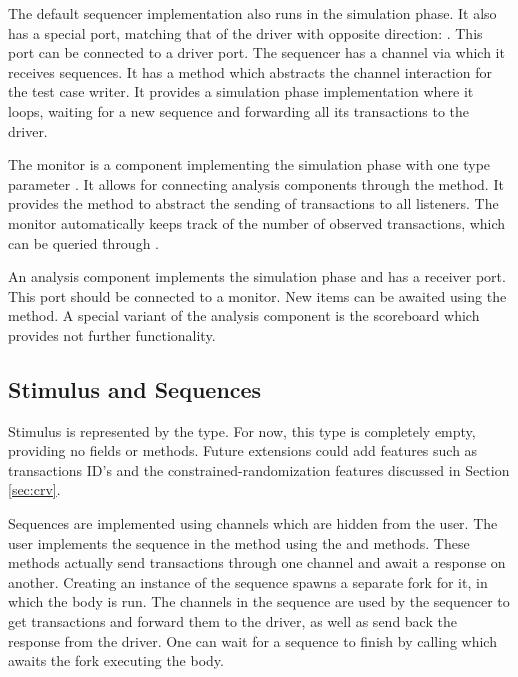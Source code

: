 The default sequencer implementation also runs in the simulation phase. It also has a special port, matching that of
the driver with opposite direction: . This port can be connected to a driver port. The
sequencer has a channel via which it receives sequences. It has a  method which
abstracts the channel interaction for the test case writer. It provides a simulation phase implementation where it
loops, waiting for a new sequence and forwarding all its transactions to the driver.

The monitor is a component implementing the simulation phase with one type parameter . It allows for
connecting analysis components through the  method. It provides the
 method to abstract the sending of transactions to all listeners. The monitor automatically keeps
track of the number of observed transactions, which can be queried through .

An analysis component implements the simulation phase and has a receiver port. This port should be connected to a
monitor. New items can be awaited using the  method. A special variant of the analysis component is the
scoreboard which provides not further functionality.

\subsection{Stimulus and Sequences} %

Stimulus is represented by the  type. For now, this type is completely empty, providing no fields or
methods. Future extensions could add features such as transactions ID's and the constrained-randomization features
discussed in Section \ref{sec:crv}.

Sequences are implemented using channels which are hidden from the user. The user implements the sequence in the
 method using the  and  methods. These methods actually send
transactions through one channel and await a response on another. Creating an instance of the sequence spawns a
separate fork for it, in which the body is run. The channels in the sequence are used by the sequencer to get
transactions and forward them to the driver, as well as send back the response from the driver. One can wait for a
sequence to finish by calling  which awaits the fork executing the body.

